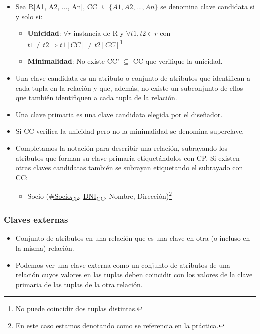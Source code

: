 \begin{itemize}
    \item Sea R[A1, A2, ..., An], CC $\subseteq \{A1, A2, ..., An\}$ se denomina clave candidata si y solo si:
        \begin{itemize}
            \item \textbf{Unicidad}: $\forall r$ instancia de R y $\forall t1, t2 \in r$ con $t1 \neq t2 \Rightarrow t1[CC] \neq t2[CC]$\footnote{No puede coincidir dos tuplas distintas.}
            \item \textbf{Minimalidad}: No existe CC' $\subseteq$ CC que verifique la unicidad.
        \end{itemize}
        \item Una clave candidata es un atributo o conjunto de atributos que identifican a cada tupla en la relación y que, además, no existe un subconjunto de ellos que también identifiquen a cada tupla de la relación.
        \item Una clave primaria es una clave candidata elegida por el diseñador.
        \item Si CC verifica la unicidad pero no la minimalidad se denomina superclave.
        \item Completamos la notación para describir una relación, subrayando los atributos que forman su clave primaria etiquetándolos con CP. Si existen otras claves candidatas también se subrayan etiquetando el subrayado con CC:
        \begin{itemize}
            \item Socio (\underline{\#Socio\textsubscript{CP}}, \underline{DNI\textsubscript{CC}}, Nombre, Dirección)\footnote{En este caso estamos denotando como se referencia en la práctica.}
        \end{itemize}
\end{itemize}

\subsubsection*{Claves externas}

\begin{itemize}
    \item Conjunto de atributos en una relación que es una clave en otra (o incluso en la misma) relación.
    \item Podemos ver una clave externa como un conjunto de atributos de una relación cuyos valores en las tuplas deben coincidir con los valores de la clave primaria de las tuplas de la otra relación.
\end{itemize}


